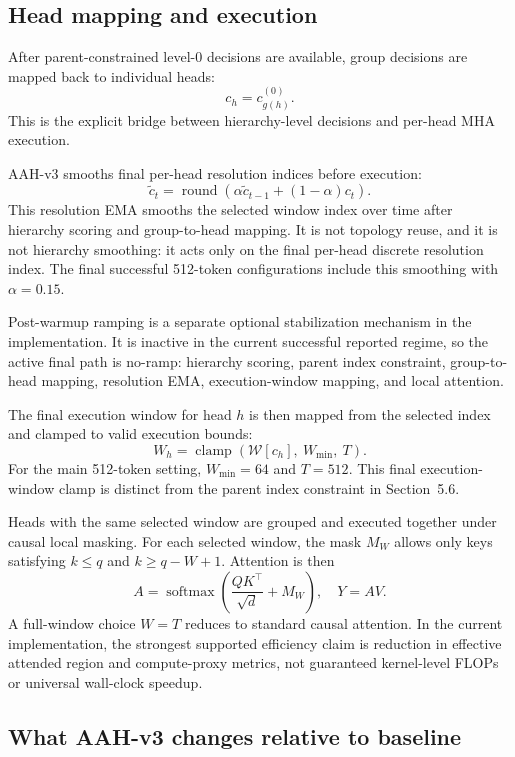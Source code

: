 \documentclass[11pt]{article}
\begin{document}
\subsection{Head mapping and execution}

After parent-constrained level-0 decisions are available, group decisions are mapped back to individual heads:
\[
  c_h = c_{g(h)}^{(0)}.
\]
This is the explicit bridge between hierarchy-level decisions and per-head MHA execution.

AAH-v3 smooths final per-head resolution indices before execution:
\[
  \tilde c_t = \operatorname{round}\left(\alpha \tilde c_{t-1} + (1-\alpha)c_t\right).
\]
This resolution EMA smooths the selected window index over time after hierarchy scoring and group-to-head mapping. It is not topology reuse, and it is not hierarchy smoothing: it acts only on the final per-head discrete resolution index. The final successful 512-token configurations include this smoothing with \(\alpha=0.15\).

Post-warmup ramping is a separate optional stabilization mechanism in the implementation. It is inactive in the current successful reported regime, so the active final path is no-ramp: hierarchy scoring, parent index constraint, group-to-head mapping, resolution EMA, execution-window mapping, and local attention.

The final execution window for head \(h\) is then mapped from the selected index and clamped to valid execution bounds:
\[
  W_h = \operatorname{clamp}(\mathcal W[c_h],\ W_{\min},\ T).
\]
For the main 512-token setting, \(W_{\min}=64\) and \(T=512\). This final execution-window clamp is distinct from the parent index constraint in Section~5.6.

Heads with the same selected window are grouped and executed together under causal local masking. For each selected window, the mask \(M_W\) allows only keys satisfying \(k\le q\) and \(k\ge q-W+1\). Attention is then
\[
  A = \operatorname{softmax}\left(\frac{QK^\top}{\sqrt d} + M_W\right), \quad Y = AV.
\]
A full-window choice \(W=T\) reduces to standard causal attention. In the current implementation, the strongest supported efficiency claim is reduction in effective attended region and compute-proxy metrics, not guaranteed kernel-level FLOPs or universal wall-clock speedup.

\subsection{What AAH-v3 changes relative to baseline}
\end{document}
